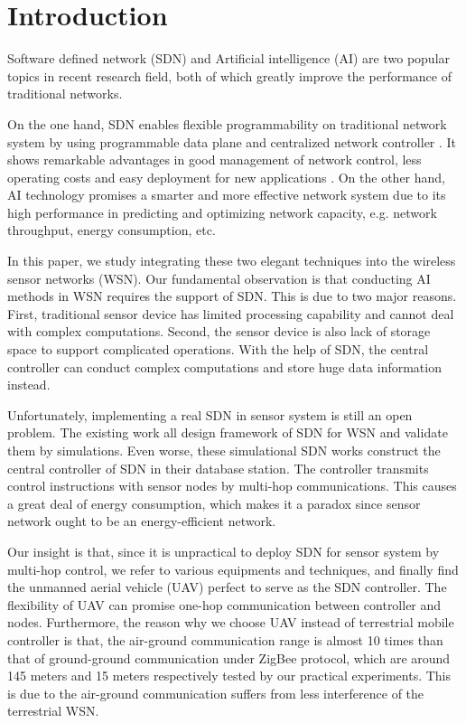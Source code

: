 \section{Introduction}




 
Software defined network (SDN) and Artificial intelligence (AI) 
are two popular topics in recent research field, 
both of which greatly improve the performance of traditional
networks.
 
On the one hand, SDN enables flexible 
programmability on traditional network system 
by using programmable data plane and centralized network controller \cite{}.
It shows remarkable advantages in good management of network control, 
less operating costs and easy deployment for new applications \cite{}.
On the other hand, AI technology promises a smarter and more effective network system
due to its high performance in predicting and optimizing network capacity,
e.g. network throughput, energy consumption, etc.

In this paper, we study integrating these two elegant techniques into 
the wireless sensor networks (WSN). Our fundamental observation is 
that conducting AI methods in WSN requires
the support of SDN. This is due to two major reasons. 
First, traditional sensor device 
has limited processing capability and cannot deal with complex computations.
Second, the sensor device is also lack of storage space 
to support complicated operations. With the help of SDN, 
the central controller can conduct complex computations 
and store huge data information instead.
  
Unfortunately, implementing a real SDN in sensor system 
is still an open problem. The existing work 
\cite{mahmud2011exploitation, costanzo2012software, luo2012sensor, de2015tinysdn, galluccio2015sdn} 
all design framework of SDN for WSN and validate them by simulations.  
Even worse, these simulational SDN works construct the central controller 
of SDN in their database station. The controller transmits control 
instructions with sensor nodes by multi-hop communications.
This causes a great deal of energy consumption, which 
makes it a paradox since sensor network ought to be an energy-efficient network.

Our insight is that, since it is unpractical to deploy SDN 
for sensor system by multi-hop control,
we refer to various equipments and techniques, 
and finally find the unmanned aerial vehicle (UAV) 
perfect to serve as the SDN controller. The flexibility
of UAV can promise one-hop communication between controller
and nodes. Furthermore, the reason why we choose UAV instead of
terrestrial mobile controller is that, the air-ground communication range
is almost 10 times than that of ground-ground communication under ZigBee protocol, which are
around 145 meters and 15 meters respectively tested by our practical experiments.
This is due to the air-ground communication suffers from less interference of the terrestrial WSN.
 

